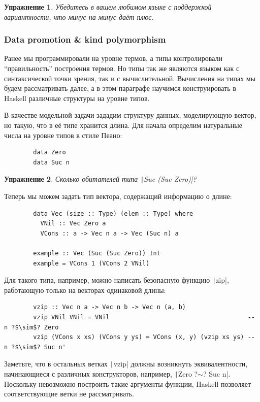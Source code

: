 \documentclass[12pt]{article}
\newtheorem{task}{Упражнение}
\begin{document}
    \begin{task}
        Убедитесь в вашем любимом языке с поддержкой вариантности, что минус на минус даёт плюс.
    \end{task}

    \subsubsection{Data promotion \& kind polymorphism}

    Ранее мы программировали на уровне термов, а типы контролировали ``правильность'' построения термов.
    Но типы так же являются языком как с синтаксической точки зрения, так и с вычислительной.
    Вычисления на типах мы будем рассматривать далее, а в этом параграфе научимся конструировать в Haskell различные структуры на уровне типов.

    В качестве модельной задачи зададим структуру данных, моделирующую вектор, но такую, что в её типе хранится длина.
    Для начала определим натуральные числа на уровне типов в стиле Пеано:
    \begin{verbatim}
        data Zero
        data Suc n
    \end{verbatim}

    \begin{task}
        Сколько обитателей типа \texttt|Suc (Suc Zero)|?
    \end{task}

    Теперь мы можем задать тип вектора, содержащий информацию о длине:
    \begin{verbatim}
        data Vec (size :: Type) (elem :: Type) where
          VNil :: Vec Zero a
          VCons :: a -> Vec n a -> Vec (Suc n) a

        example :: Vec (Suc (Suc Zero)) Int
        example = VCons 1 (VCons 2 VNil)
    \end{verbatim}

    Для такого типа, например, можно написать безопасную функцию \texttt|zip|, работающую только на векторах одинаковой длины:
    \begin{verbatim}
        vzip :: Vec n a -> Vec n b -> Vec n (a, b)
        vzip VNil VNil = VNil                                      -- n ?$\sim$? Zero
        vzip (VCons x xs) (VCons y ys) = VCons (x, y) (vzip xs ys) -- n ?$\sim$? Suc n'
    \end{verbatim}

    Заметьте, что в остальных ветках \texttt|vzip| должны возникнуть эквивалентности, начинающиеся с различных конструкторов, например, \texttt|Zero ?$\sim$? Suc n|.
    Поскольку невозможно построить такие аргументы функции, Haskell позволяет соответствующие ветки не рассматривать.
\end{document}
